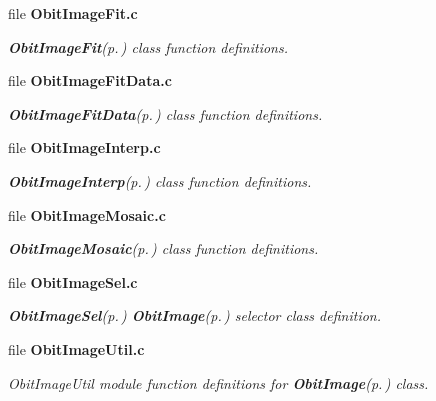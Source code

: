 \begin{CompactItemize}
\item 
file {\bf Obit\-Image\-Fit.c}
\begin{CompactList}\small\item\em {\bf Obit\-Image\-Fit}{\rm (p.\,\pageref{structObitImageFit})} class function definitions. \item\end{CompactList}

\item 
file {\bf Obit\-Image\-Fit\-Data.c}
\begin{CompactList}\small\item\em {\bf Obit\-Image\-Fit\-Data}{\rm (p.\,\pageref{structObitImageFitData})} class function definitions. \item\end{CompactList}

\item 
file {\bf Obit\-Image\-Interp.c}
\begin{CompactList}\small\item\em {\bf Obit\-Image\-Interp}{\rm (p.\,\pageref{structObitImageInterp})} class function definitions. \item\end{CompactList}

\item 
file {\bf Obit\-Image\-Mosaic.c}
\begin{CompactList}\small\item\em {\bf Obit\-Image\-Mosaic}{\rm (p.\,\pageref{structObitImageMosaic})} class function definitions. \item\end{CompactList}

\item 
file {\bf Obit\-Image\-Sel.c}
\begin{CompactList}\small\item\em {\bf Obit\-Image\-Sel}{\rm (p.\,\pageref{structObitImageSel})} {\bf Obit\-Image}{\rm (p.\,\pageref{structObitImage})} selector class definition. \item\end{CompactList}

\item 
file {\bf Obit\-Image\-Util.c}
\begin{CompactList}\small\item\em Obit\-Image\-Util module function definitions for {\bf Obit\-Image}{\rm (p.\,\pageref{structObitImage})} class. \item\end{CompactList}


\end{CompactItemize}
